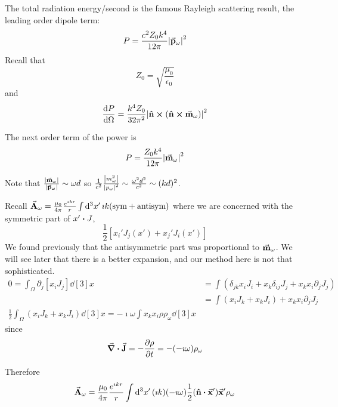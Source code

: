\documentclass[a4paper,twoside,master.tex]{subfiles}
\begin{document}

The total radiation energy/second is the famous Rayleigh scattering result, the leading order dipole term:
\begin{equation}
    P = \frac{c^2 Z_0 k^4}{12 \pi} \abs{ \va{p}_{\omega}}^2
\end{equation}
Recall that
\begin{equation}
    Z_0 = \sqrt{\frac{\mu_0}{\epsilon_0}}
\end{equation}
and
\begin{equation}
    \dv{P}{\Omega} = \frac{k^4 Z_0}{32 \pi^2} \abs{ \vu{n} \cross ( \vu{n} \cross \va{m}_{\omega})}^2
\end{equation}

The next order term of the power is
\begin{equation}
    P = \frac{Z_0 k^4}{12 \pi} \abs{ \va{m}_{\omega}}^2
\end{equation}

Note that $ \frac{\abs{ \va{m}_{\omega}}}{\abs{ \va{p}_{\omega}}} \sim \omega d $ so $ \frac{1}{c^2} \frac{\abs{m_{\omega}^2}}{\abs{p_{\omega}}^2} \sim \frac{\omega^2 d^2}{c^2} \sim (kd)^2 $.

Recall $ \va{A}_{\omega} = \frac{\mu_0}{4 \pi} \frac{e^{\imath kr}}{r} \int \dd[3]{x'} \imath k (\text{sym} + \text{antisym}) $ where we are concerned with the symmetric part of $ x' \vdot J $,
\begin{equation}
    \frac{1}{2} \left[ x_i' J_j(x') + x_j' J_i(x') \right]
\end{equation}
We found previously that the antisymmetric part was proportional to $ \va{m}_{\omega} $. We will see later that there is a better expansion, and our method here is not that sophisticated.
\begin{align}
    0 = \int_{\Omega} \partial_j \left[ x_i J_j \right] \dd[3]{x} &= \int \left( \delta_{jk} x_i J_i + x_k \delta_{ij} J_j + x_k x_i \partial_j J_j \right) \\
    &= \int \left( x_i J_k + x_k J_i \right) + x_k x_i \partial_j J_j \\
    \frac{1}{2} \int_{\Omega} \left( x_i J_k + x_k J_i \right) \dd[3]{x} = -\imath \omega \int x_k x_i \rho \rho_{\omega} \dd[3]{x}
\end{align}
since
\begin{equation}
    \div{ \va{J}} = - \pdv{\rho}{t} = - (- \imath \omega) \rho_{\omega}
\end{equation}

Therefore
\begin{equation}
    \va{A}_{\omega} = \frac{\mu_0}{4 \pi} \frac{e^{\imath kr} }{r} \int \dd[3]{x'} (\imath k)(- \imath \omega) \frac{1}{2} (\vu{n} \vdot \va{x}') \va{x}' \rho_{\omega}
\end{equation}
\end{document}
